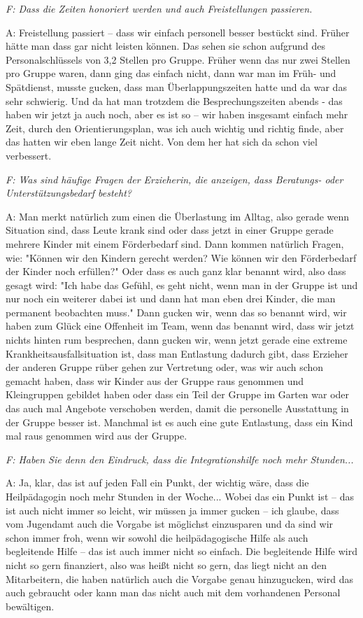 \emph{F: Dass die Zeiten honoriert werden und auch Freistellungen passieren.}

A: Freistellung passiert – dass wir einfach personell besser bestückt sind. Früher hätte man dass gar nicht leisten können. Das sehen sie schon aufgrund des Personalschlüssels von 3,2 Stellen pro Gruppe. Früher wenn das nur zwei Stellen pro Gruppe waren, dann ging das einfach nicht, dann war man im Früh- und Spätdienst, musste gucken, dass man Überlappungszeiten hatte und da war das sehr schwierig. Und da hat man trotzdem die Besprechungszeiten abends  - das haben wir jetzt ja auch noch, aber es ist so – wir haben insgesamt einfach mehr Zeit, durch den Orientierungsplan, was ich auch wichtig und richtig finde, aber das hatten wir eben lange Zeit nicht. Von dem her hat sich da schon viel verbessert. 

\emph{F: Was sind häufige Fragen der Erzieherin, die anzeigen, dass Beratungs- oder Unterstützungsbedarf besteht?}

A: Man merkt natürlich zum einen die Überlastung im Alltag, also gerade wenn Situation sind, dass Leute krank sind oder dass jetzt in einer Gruppe gerade mehrere Kinder mit einem Förderbedarf sind. Dann kommen natürlich Fragen, wie: "Können wir den Kindern gerecht werden? Wie können wir den Förderbedarf der Kinder noch erfüllen?" Oder dass es auch ganz klar benannt wird, also dass gesagt wird: "Ich habe das Gefühl, es geht nicht, wenn man in der Gruppe ist und nur noch ein weiterer dabei ist und dann hat man eben drei Kinder, die man permanent beobachten muss." Dann gucken wir, wenn das so benannt wird, wir haben zum Glück eine Offenheit im Team, wenn das benannt wird, dass wir jetzt nichts hinten rum besprechen, dann gucken wir, wenn jetzt gerade eine extreme Krankheitsausfallsituation ist, dass man Entlastung dadurch gibt, dass Erzieher der anderen Gruppe rüber gehen zur Vertretung oder, was wir auch schon gemacht haben, dass wir Kinder aus der Gruppe raus genommen und Kleingruppen gebildet haben oder dass ein Teil der Gruppe im Garten war oder das auch mal Angebote verschoben werden, damit die personelle Ausstattung in der Gruppe besser ist. Manchmal ist es auch eine gute Entlastung, dass ein Kind mal raus genommen wird aus der Gruppe. 

\emph{F: Haben Sie denn den Eindruck, dass die Integrationshilfe noch mehr Stunden...}

A: Ja, klar, das ist auf jeden Fall ein Punkt, der wichtig wäre, dass die Heilpädagogin noch mehr Stunden in der Woche... Wobei das ein Punkt ist -- das ist auch nicht immer so leicht, wir müssen ja immer gucken -- ich glaube, dass vom Jugendamt auch die Vorgabe ist möglichst einzusparen und da sind wir schon immer froh, wenn wir sowohl die heilpädagogische Hilfe als auch begleitende Hilfe -- das ist auch immer nicht so einfach. Die begleitende Hilfe wird nicht so gern finanziert, also was heißt nicht so gern, das liegt nicht an den Mitarbeitern, die haben natürlich auch die Vorgabe genau hinzugucken, wird das auch gebraucht oder kann man das nicht auch mit dem vorhandenen Personal bewältigen. 


